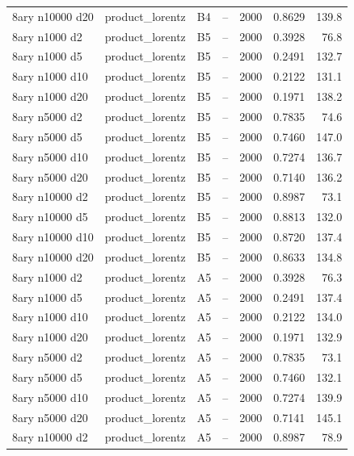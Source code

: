 \begin{longtable}{llllrrr}
8ary n10000 d20 & product\_lorentz & B4 & -- & 2000 & 0.8629 & 139.8 \\
\rowcolor{oursbg}
8ary n1000 d2 & product\_lorentz & B5 & -- & 2000 & 0.3928 & 76.8 \\
\rowcolor{oursbg}
8ary n1000 d5 & product\_lorentz & B5 & -- & 2000 & 0.2491 & 132.7 \\
\rowcolor{oursbg}
8ary n1000 d10 & product\_lorentz & B5 & -- & 2000 & 0.2122 & 131.1 \\
\rowcolor{oursbg}
8ary n1000 d20 & product\_lorentz & B5 & -- & 2000 & 0.1971 & 138.2 \\
\rowcolor{oursbg}
8ary n5000 d2 & product\_lorentz & B5 & -- & 2000 & 0.7835 & 74.6 \\
\rowcolor{oursbg}
8ary n5000 d5 & product\_lorentz & B5 & -- & 2000 & 0.7460 & 147.0 \\
\rowcolor{oursbg}
8ary n5000 d10 & product\_lorentz & B5 & -- & 2000 & 0.7274 & 136.7 \\
\rowcolor{oursbg}
8ary n5000 d20 & product\_lorentz & B5 & -- & 2000 & 0.7140 & 136.2 \\
\rowcolor{oursbg}
8ary n10000 d2 & product\_lorentz & B5 & -- & 2000 & 0.8987 & 73.1 \\
\rowcolor{oursbg}
8ary n10000 d5 & product\_lorentz & B5 & -- & 2000 & 0.8813 & 132.0 \\
\rowcolor{oursbg}
8ary n10000 d10 & product\_lorentz & B5 & -- & 2000 & 0.8720 & 137.4 \\
\rowcolor{oursbg}
8ary n10000 d20 & product\_lorentz & B5 & -- & 2000 & 0.8633 & 134.8 \\
8ary n1000 d2 & product\_lorentz & A5 & -- & 2000 & 0.3928 & 76.3 \\
8ary n1000 d5 & product\_lorentz & A5 & -- & 2000 & 0.2491 & 137.4 \\
8ary n1000 d10 & product\_lorentz & A5 & -- & 2000 & 0.2122 & 134.0 \\
8ary n1000 d20 & product\_lorentz & A5 & -- & 2000 & 0.1971 & 132.9 \\
8ary n5000 d2 & product\_lorentz & A5 & -- & 2000 & 0.7835 & 73.1 \\
8ary n5000 d5 & product\_lorentz & A5 & -- & 2000 & 0.7460 & 132.1 \\
8ary n5000 d10 & product\_lorentz & A5 & -- & 2000 & 0.7274 & 139.9 \\
8ary n5000 d20 & product\_lorentz & A5 & -- & 2000 & 0.7141 & 145.1 \\
8ary n10000 d2 & product\_lorentz & A5 & -- & 2000 & 0.8987 & 78.9 \\

\end{longtable}
